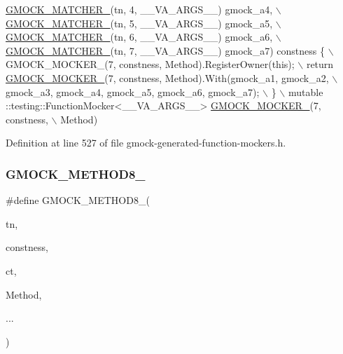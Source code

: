 \begin{DoxyCode}
                     \hyperlink{gmock-generated-function-mockers_8h_aa87d0009fe91f1c89d658776b55a769c}{GMOCK\_MATCHER\_}(tn, 4, \_\_VA\_ARGS\_\_) gmock\_a4, \(\backslash\)
                     \hyperlink{gmock-generated-function-mockers_8h_aa87d0009fe91f1c89d658776b55a769c}{GMOCK\_MATCHER\_}(tn, 5, \_\_VA\_ARGS\_\_) gmock\_a5, \(\backslash\)
                     \hyperlink{gmock-generated-function-mockers_8h_aa87d0009fe91f1c89d658776b55a769c}{GMOCK\_MATCHER\_}(tn, 6, \_\_VA\_ARGS\_\_) gmock\_a6, \(\backslash\)
                     \hyperlink{gmock-generated-function-mockers_8h_aa87d0009fe91f1c89d658776b55a769c}{GMOCK\_MATCHER\_}(tn, 7, \_\_VA\_ARGS\_\_) gmock\_a7) constness \{ \(\backslash\)
    GMOCK\_MOCKER\_(7, constness, Method).RegisterOwner(\textcolor{keyword}{this}); \(\backslash\)
    return \hyperlink{gmock-generated-function-mockers_8h_a7d362499e27b1bc3a9806dd3cf58a5b7}{GMOCK\_MOCKER\_}(7, constness, Method).With(gmock\_a1, gmock\_a2, \(\backslash\)
        gmock\_a3, gmock\_a4, gmock\_a5, gmock\_a6, gmock\_a7); \(\backslash\)
  \} \(\backslash\)
  mutable ::testing::FunctionMocker<\_\_VA\_ARGS\_\_> \hyperlink{gmock-generated-function-mockers_8h_a7d362499e27b1bc3a9806dd3cf58a5b7}{GMOCK\_MOCKER\_}(7, constness, \(\backslash\)
      Method)
\end{DoxyCode}


Definition at line 527 of file gmock-\/generated-\/function-\/mockers.\+h.

\mbox{\label{gmock-generated-function-mockers_8h_aa84a36427c44505207b7cad5dec7ad67}} 
\subsubsection{\texorpdfstring{G\+M\+O\+C\+K\+\_\+\+M\+E\+T\+H\+O\+D8\+\_\+}{GMOCK\_METHOD8\_}}
{\footnotesize\ttfamily \#define G\+M\+O\+C\+K\+\_\+\+M\+E\+T\+H\+O\+D8\+\_\+(\begin{DoxyParamCaption}\item[{}]{tn,  }\item[{}]{constness,  }\item[{}]{ct,  }\item[{}]{Method,  }\item[{}]{... }\end{DoxyParamCaption})}



